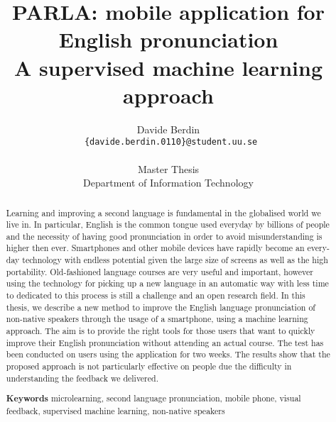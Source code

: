 \documentclass{report}
\title{PARLA: mobile application for English pronunciation \\ A supervised machine learning approach}
\author{Davide Berdin \\
  \texttt{ \{davide.berdin.0110\}@student.uu.se} \\
  \\ Master Thesis
  \\ Department of Information Technology}
\newcommand\blankpage{%
    \null
    \thispagestyle{empty}%
    \addtocounter{page}{-1}%
    \newpage}
\begin{document}
\maketitle


\blankpage

\blankpage

\begin{abstract}
Learning and improving a second language is fundamental in the globalised world we live in. In particular, English is the common tongue used everyday by billions of people and the necessity of having good pronunciation in order to avoid misunderstanding is higher then ever. Smartphones and other mobile devices have rapidly become an every-day technology with endless potential given the large size of screens as well as the high portability. Old-fashioned language courses are very useful and important, however using the technology for picking up a new language in an automatic way with less time to dedicated to this process is still a challenge and an open research field. In this thesis, we describe a new method to improve the English language pronunciation of non-native speakers through the usage of a smartphone, using a machine learning approach. The aim is to provide the right tools for those users that want to quickly improve their English pronunciation without attending an actual course.
The test has been conducted on users using the application for two weeks. The results show that the proposed approach is not particularly effective on people due the difficulty in understanding the feedback we delivered. \vspace{5in}


\textbf{Keywords} microlearning, second language pronunciation, mobile phone, visual feedback, supervised machine learning, non-native speakers
\end{abstract}

\blankpage
\end{document}
